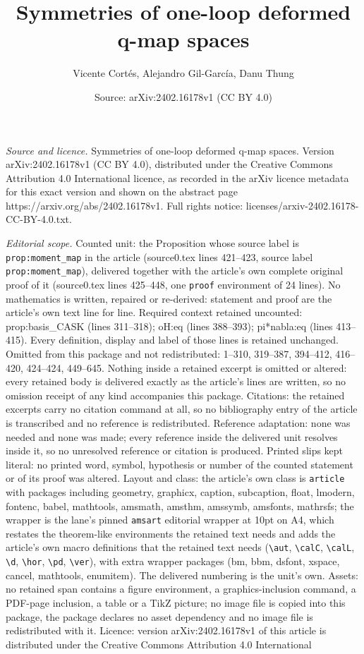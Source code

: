 \documentclass[10pt,a4paper]{amsart}
\title[Symmetries of one-loop deformed q-map spaces]{Symmetries of one-loop deformed q-map spaces}
\author{Vicente Cort\'es, Alejandro Gil-Garc\'ia, Danu Thung}
\date{Source: arXiv:2402.16178v1 (CC BY 4.0)}
\begin{document}
\maketitle

\noindent\emph{Source and licence.} Symmetries of one-loop deformed q-map spaces. Version arXiv:2402.16178v1 (CC BY 4.0), distributed under the Creative Commons Attribution 4.0 International licence, as recorded in the arXiv licence metadata for this exact version and shown on the abstract page https://arxiv.org/abs/2402.16178v1. Full rights notice: licenses/arxiv-2402.16178-CC-BY-4.0.txt.\par\smallskip

\noindent\textit{Editorial scope.} Counted unit: the Proposition whose source label is \texttt{prop:moment\_map} in the article (source0.tex lines 421--423, source label \texttt{prop:moment\_map}), delivered together with the article's own complete original proof of it (source0.tex lines 425--448, one \texttt{proof} environment of 24 lines). No mathematics is written, repaired or re-derived: statement and proof are the article's own text line for line. Required context retained uncounted: prop:basis\_CASK (lines 311--318); oH:eq (lines 388--393); pi*nabla:eq (lines 413--415). Every definition, display and label of those lines is retained unchanged. Omitted from this package and not redistributed: 1--310, 319--387, 394--412, 416--420, 424--424, 449--645. Nothing inside a retained excerpt is omitted or altered: every retained body is delivered exactly as the article's lines are written, so no omission receipt of any kind accompanies this package. Citations: the retained excerpts carry no citation command at all, so no bibliography entry of the article is transcribed and no reference is redistributed. Reference adaptation: none was needed and none was made; every reference inside the delivered unit resolves inside it, so no unresolved reference or citation is produced. Printed slips kept literal: no printed word, symbol, hypothesis or number of the counted statement or of its proof was altered. Layout and class: the article's own class is \texttt{article} with packages including geometry, graphicx, caption, subcaption, float, lmodern, fontenc, babel, mathtools, amsmath, amsthm, amssymb, amsfonts, mathrsfs; the wrapper is the lane's pinned \texttt{amsart} editorial wrapper at 10pt on A4, which restates the theorem-like environments the retained text needs and adds the article's own macro definitions that the retained text needs (\texttt{\textbackslash aut}, \texttt{\textbackslash calC}, \texttt{\textbackslash calL}, \texttt{\textbackslash d}, \texttt{\textbackslash hor}, \texttt{\textbackslash pd}, \texttt{\textbackslash ver}), with extra wrapper packages (bm, bbm, dsfont, xspace, cancel, mathtools, enumitem). The delivered numbering is the unit's own. Assets: no retained span contains a figure environment, a graphics-inclusion command, a PDF-page inclusion, a table or a TikZ picture; no image file is copied into this package, the package declares no asset dependency and no image file is redistributed with it. Licence: version arXiv:2402.16178v1 of this article is distributed under the Creative Commons Attribution 4.0 International 
\end{document}
